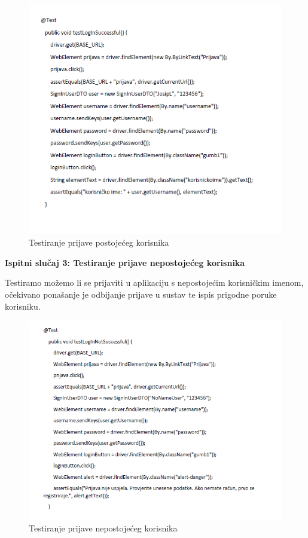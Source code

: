 			
			\begin{figure}[H]
				\includegraphics[scale=1.1]{slike/sel2.PNG} %
				\centering
				\caption{Testiranje prijave postojećeg korisnika}
				\label{fig:sel2}
			\end{figure}
			
			\textbf{Ispitni slučaj 3: Testiranje prijave nepostojećeg korisnika
				}
			
			Testiramo možemo li se prijaviti u aplikaciju s nepostojećim korisničkim imenom, očekivano ponašanje je odbijanje prijave u sustav te ispis prigodne poruke korisniku.
			
			\begin{figure}[H]
				\includegraphics[scale=1.1]{slike/sel3.PNG} %
				\centering
				\caption{Testiranje prijave nepostojećeg korisnika}
				\label{fig:sel3}
			\end{figure}
			
